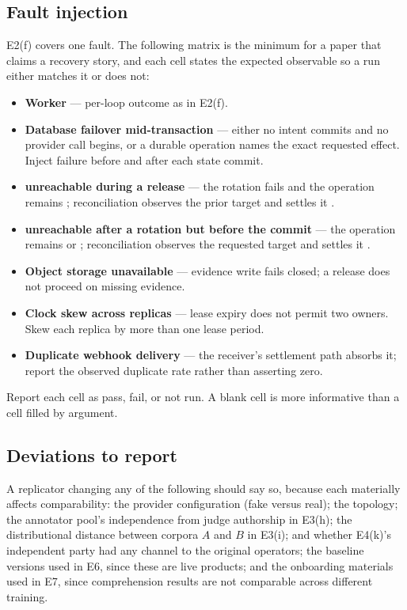 \subsection{Fault injection}

E2(f) covers one fault. The following matrix is the minimum for a paper that claims
a recovery story, and each cell states the expected observable so a run either
matches it or does not:

\begin{itemize}
\item \textbf{Worker } --- per-loop outcome as in E2(f).
\item \textbf{Database failover mid-transaction} --- either no intent commits and
      no provider call begins, or a durable operation names the exact requested
      effect. Inject failure before and after each state commit.
\item \textbf{\mlflow{} unreachable during a release} --- the rotation fails and
      the operation remains ; reconciliation observes
      the prior target and settles it .
\item \textbf{\mlflow{} unreachable after a rotation but before the commit} ---
      the operation remains  or ;
      reconciliation observes the requested target and settles it .
\item \textbf{Object storage unavailable} --- evidence write fails closed; a
      release does not proceed on missing evidence.
\item \textbf{Clock skew across replicas} --- lease expiry does not permit two
      owners. Skew each replica by more than one lease period.
\item \textbf{Duplicate webhook delivery} --- the receiver's settlement path
      absorbs it; report the observed duplicate rate rather than asserting zero.
\end{itemize}

Report each cell as pass, fail, or not run. A blank cell is more informative than a
cell filled by argument.

\subsection{Deviations to report}

A replicator changing any of the following should say so, because each materially
affects comparability: the provider configuration (fake versus real); the topology;
the annotator pool's independence from judge authorship in E3(h); the distributional
distance between corpora $A$ and $B$ in E3(i); and whether E4(k)'s independent party
had any channel to the original operators; the baseline versions used in E6, since
these are live products; and the onboarding materials used in E7, since
comprehension results are not comparable across different training.
